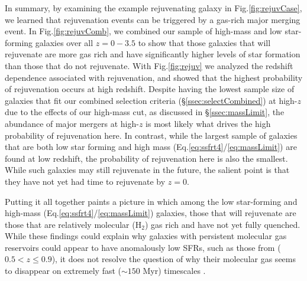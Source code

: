 \documentclass[twocolumn, linenumbers]{aastex631}
\newcommand{\hh}{\text{H}_2}
\newcommand{\eq}{Eq.\hspace{.2em}}
\renewcommand{\fig}{Fig.\hspace{.2em}}
\begin{document}
In summary, by examining the example rejuvenating galaxy in \fig \ref{fig:rejuvCase}, we learned that rejuvenation events can be triggered by a gas-rich major merging event.  In \fig \ref{fig:rejuvComb}, we combined our sample of high-mass and low star-forming galaxies over all $z=0-3.5$ to show that those galaxies that will rejuvenate are more gas rich and have significantly higher levels of star formation than those that do not rejuvenate.  With \fig \ref{fig:rejuv} we analyzed the redshift dependence associated with rejuvenation, and showed that the highest probability of rejuvenation occurs at high redshift.  Despite having the lowest sample size of galaxies that fit our combined selection criteria (\S\ref{ssec:selectCombined}) at high-$z$ due to the effects of our high-mass cut, as discussed in \S\ref{ssec:massLimit}, the abundance of major mergers at high-$z$ is most likely what drives the high probability of rejuvenation here.  In contrast, while the largest sample of galaxies that are both low star forming and high mass (\eq \ref{eq:ssfrt4}/\ref{eq:massLimit}) are found at low redshift, the probability of rejuvenation here is also the smallest. While such galaxies may still rejuvenate in the future, the salient point is that they have not yet had time to rejuvenate by $z=0$.

Putting it all together paints a picture in which among the low star-forming and high-mass (\eq \ref{eq:ssfrt4}/\ref{eq:massLimit}) galaxies, those that will rejuvenate are those that are relatively molecular ($\hh$) gas rich and have not yet fully quenched.  While these findings could explain why galaxies with persistent molecular gas reservoirs could appear to have anomalously low SFRs, such as those from \cite{suessSquiggle} ($0.5<z\leq 0.9$), it does not resolve the question of why their molecular gas seems to disappear on extremely fast ($\sim150$ Myr) timescales \citep{setton2025}.

\end{document}
